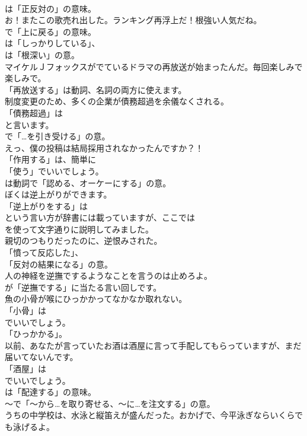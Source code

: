 \documentclass[8pt]{extreport}
\begin{document}
\begin{CJK}{UTF8}{min}
\\	は「正反対の」の意味。	
\\	お！またこの歌売れ出した。ランキング再浮上だ！根強い人気だね。 
\\	で「上に戻る」の意味。
\\	は「しっかりしている」、
\\	は「根深い」の意。	
\\	マイケルＪフォックスがでているドラマの再放送が始まったんだ。毎回楽しみで楽しみで。 
\\	「再放送する」は動詞、名詞の両方に使えます。	
\\	制度変更のため、多くの企業が債務超過を余儀なくされる。 
\\	「債務超過」は
\\	と言います。
\\	で「…を引き受ける」の意。	
\\	えっ、僕の投稿は結局採用されなかったんですか？！ 
\\	「作用する」は、簡単に
\\	「使う」でいいでしょう。
\\	は動詞で「認める、オーケーにする」の意。	
\\	ぼくは逆上がりができます。 
\\	「逆上がりをする」は
\\	という言い方が辞書には載っていますが、ここでは
\\	を使って文字通りに説明してみました。	
\\	親切のつもりだったのに、逆恨みされた。 
\\	「憤って反応した」、
\\	「反対の結果になる」の意。	
\\	人の神経を逆撫でするようなことを言うのは止めろよ。 
\\	が「逆撫でする」に当たる言い回しです。	
\\	魚の小骨が喉にひっかかってなかなか取れない。 
\\	「小骨」は
\\	でいいでしょう。
\\	「ひっかかる」。	
\\	以前、あなたが言っていたお酒は酒屋に言って手配してもらっていますが、まだ届いてないんです。 
\\	「酒屋」は
\\	でいいでしょう。
\\	は「配達する」の意味。
\\	～で「～から…を取り寄せる、～に…を注文する」の意。	
\\	うちの中学校は、水泳と縦笛えが盛んだった。おかげで、今平泳ぎならいくらでも泳げるよ。 

\end{CJK}
\end{document}
